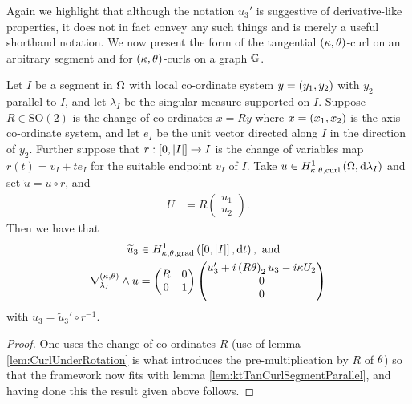 Again we highlight that although the notation $u_3'$ is suggestive of derivative-like properties, it does not in fact convey any such things and is merely a useful shorthand notation.
We now present the form of the tangential $\left( \kappa, \theta \right)$-curl on an arbitrary segment and for $\left( \kappa, \theta \right)$-curls on a graph $\mathbb{G}$.
\begin{lemma} \label{ktTanCurlGeneralSegment}
	Let $I$ be a segment in $\Omega$ with local co-ordinate system $y=\left( y_1,y_2 \right)$ with $y_2$ parallel to $I$, and let $\lambda_I$ be the singular measure supported on $I$.
	Suppose $R\in\mathrm{SO}(2)$ is the change of co-ordinates $x=Ry$ where $x=\left( x_1,x_2 \right)$ is the axis co-ordinate system, and let $e_I$ be the unit vector directed along $I$ in the direction of $y_2$.
	Further suppose that $r:\left[ 0,\left\lvert I \right\rvert \right]\rightarrow I$ is the change of variables map $r(t) = v_I + te_I$ for the suitable endpoint $v_I$ of $I$.
	Take $u\in H^1_{\kappa,\theta,\mathrm{curl}}\left( \Omega, \mathrm{d}\lambda_I \right)$ and set $\widetilde{u} = u \circ r$, and
	\begin{align*}
		U &= R\begin{pmatrix} u_1 \\ u_2 \end{pmatrix}.
	\end{align*}
	Then we have that 
	\begin{align*}
		\widetilde{u}_3 &\in H^1_{\kappa,\theta,\mathrm{grad}}\left( \left[ 0,\left\lvert I \right\rvert \right], \mathrm{d}t \right), \text{ and }\\
		\nabla_{\lambda_I}^{\left( \kappa, \theta \right)}\wedge u &= \begin{pmatrix} R & 0 \\ 0 & 1 \end{pmatrix} \begin{pmatrix} u_3' + i\left( R\theta \right)_2u_3 - i\kappa U_2 \\ 0 \\ 0 \end{pmatrix}
	\end{align*}
	with $u_3 = \widetilde{u}_3' \circ r^{-1}$.
\end{lemma}
\begin{proof}
	One uses the change of co-ordinates $R$ (use of lemma  \ref{lem:CurlUnderRotation} is what introduces the pre-multiplication by $R$ of $\theta$) so that the framework now fits with lemma \ref{lem:ktTanCurlSegmentParallel}, and having done this the result given above follows.
\end{proof}

